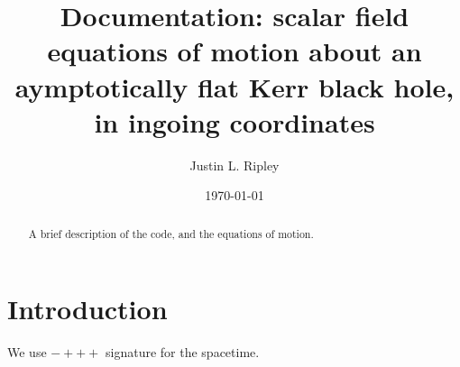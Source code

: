 \documentclass[%
 prd,
amsmath,amssymb,
preprint,%
]{revtex4-1}
\begin{document}

\title{
   Documentation: scalar field equations of motion about
   an aymptotically flat Kerr black hole, in ingoing coordinates 
}

\author{Justin L. Ripley}
%

\date{\today}%

\begin{abstract}
   A brief description of the code, and the equations of motion.
\end{abstract}

\maketitle

%
\section{\label{sec:introduction}Introduction}
We use $-+++$ signature for the spacetime.
\end{document}
